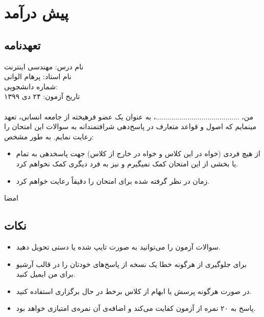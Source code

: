 \documentclass[../main.tex]{subfiles}
\begin{document}
\section{پیش درآمد}
\subsection{تعهدنامه}
نام درس:‌ مهندسی اینترنت\\
نام استاد:‌ پرهام الوانی\\
شماره دانشجویی:‌ \hspace{2em}\\
تاریخ آزمون: ۲۴ دی ۱۳۹۹

\paragraph{}
من، ..........................................، به عنوان یک عضو فرهیخته از جامعه انسانی،
تعهد مینمایم که اصول و قواعد متعارف در پاسخ‌دهی
شرافتمندانه به سوالات این امتحان را رعایت نمایم. به طور مشخص:

\begin{itemize}
    \item  از هیچ فردی (خواه در این کلاس و خواه در خارج از کلاس) جهت پاسخدهی به تمام یا بخشی از
    این امتحان کمک نمیگیرم و نیز به فرد دیگری کمک نخواهم کرد.
    \item زمان در نظر گرفته شده برای امتحان را دقیقاً رعایت خواهم کرد.
\end{itemize}

امضا

\subsection{نکات}
\begin{itemize}
    \item سوالات آزمون را می‌توانید به صورت تایپ شده یا دستی تحویل دهید.
    \item برای جلوگیری از هرگونه خطا یک نسخه از پاسخ‌های خودتان را در قالب آرشیو برای من ایمیل کنید.
    \item در صورت هرگونه پرسش یا ابهام از کلاس برخط در حال برگزاری استفاده کنید.
    \item پاسخ به ۲۰ نمره از آزمون کفایت می‌کند و اضافه‌ی آن نمره‌ی امتیازی خواهد بود.
\end{itemize}
\end{document}
